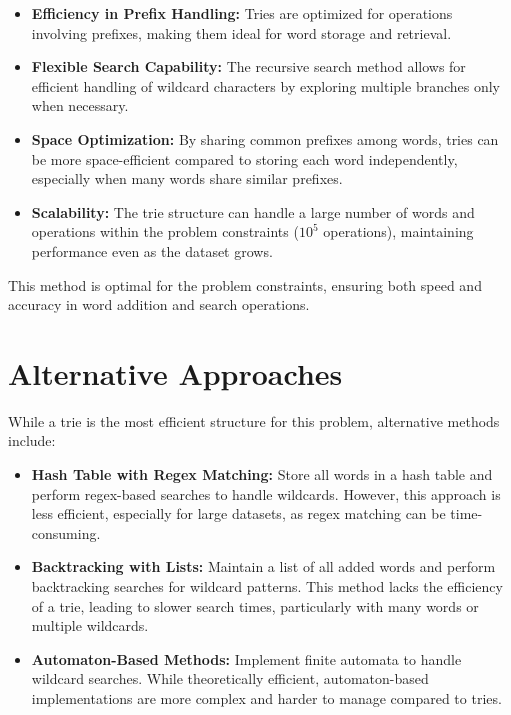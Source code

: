 \begin{itemize}
    \item \textbf{Efficiency in Prefix Handling:}  
    Tries are optimized for operations involving prefixes, making them ideal for word storage and retrieval.
    
    \item \textbf{Flexible Search Capability:}  
    The recursive search method allows for efficient handling of wildcard characters by exploring multiple branches only when necessary.
    
    \item \textbf{Space Optimization:}  
    By sharing common prefixes among words, tries can be more space-efficient compared to storing each word independently, especially when many words share similar prefixes.
    
    \item \textbf{Scalability:}  
    The trie structure can handle a large number of words and operations within the problem constraints (\(10^5\) operations), maintaining performance even as the dataset grows.
\end{itemize}

This method is optimal for the problem constraints, ensuring both speed and accuracy in word addition and search operations.

\section*{Alternative Approaches}

While a trie is the most efficient structure for this problem, alternative methods include:

\begin{itemize}
    \item \textbf{Hash Table with Regex Matching:}  
    Store all words in a hash table and perform regex-based searches to handle wildcards. However, this approach is less efficient, especially for large datasets, as regex matching can be time-consuming.
    
    \item \textbf{Backtracking with Lists:}  
    Maintain a list of all added words and perform backtracking searches for wildcard patterns. This method lacks the efficiency of a trie, leading to slower search times, particularly with many words or multiple wildcards.
    
    \item \textbf{Automaton-Based Methods:}  
    Implement finite automata to handle wildcard searches. While theoretically efficient, automaton-based implementations are more complex and harder to manage compared to tries.
\end{itemize}

